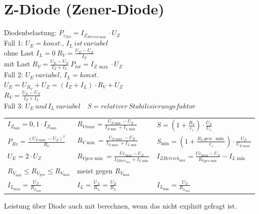 \section{Z-Diode (Zener-Diode)}\label{sec:zener-diode}
    Diodenbelastung: $P_{v_{ZD}}=I_{Z_{Betrieb\max}}\cdot U_Z$\\
    Fall 1: $U_E=konst.,\, I_L\, ist\, variabel$\\
    \hspace*{1cm} ohne Last $I_L=0\: R_V=\frac{U_E-U_Z}{I_Z}$\\
    \hspace*{1cm} mit Last $R_V=\frac{U_E-U_Z}{I_Z+I_L}\: P_{tot}=I_{Z\, \max}\cdot U_Z$\\
    Fall 2: $U_E\, variabel,\, I_L=konst.$\\
    \hspace*{1cm} $U_E=U_{R_V}+U_Z=(I_Z+I_L)\cdot R_V+U_Z$\\
    \hspace*{1cm} $R_V=\frac{U_E-U_Z}{I_Z+I_L}$\\
    Fall 3: $U_E\, und\, I_L\, variabel\quad S=relativer\, Stabilisierungsfaktor$
    \begin{table}[H]
        \renewcommand{\arraystretch}{1.2}
        \begin{tabularx}{\columnwidth}{l l l}%
            $I_{Z_{\min}}=0,1\cdot I_{Z_{\max}}$            & $R_{Vmax}=\frac{U_{E\min}-U_Z}{I_{Z\min}+I_{L\max}}$
                & $S=(1+\frac{R_V}{r_z})\cdot\frac{U_Z}{U_e}$\\
            $P_{Rv}=\frac{(U_{E\max}-U_Z)^2}{R_V}$          & $R_{V\min}=\frac{U_{E\max}-U_Z}{I_{Z\max}+I_{L\min}}$
                & $S_{\min}=(1+\frac{R_V\,gew.\,\min}{r_z})\cdot\frac{U_Z}{U_{E\max}}$\\
            $U_E=2\cdot U_Z$                                & $R_{Vgew\min}=\frac{U{e_{\max}}-U_Z}{I_{ZBetr_{\max}}+I_{L\min}}$
                & $I_{Z{Betrieb_{\max}}}=\frac{U{e_{\max}}-U_Z}{R_{Vgew\min}}-I_{L\min}$\\
            $R_{V_{\min}}\leq R_{V_{gew}} \leq R_{V_{\max}}$& meist gegen $R_{V_{\max}}$
                & \\
            $I_{L_{\max}}=\frac{U_Z}{R_{L_{\min}}}$         & $I_L=\frac{U_A}{R_L}=\frac{U_Z}{R_L}$
                & $I_{L_{\min}}=\frac{U_Z}{R_{L_{\max}}}$ \\
        \end{tabularx}
    \end{table}
    Leistung über Diode auch mit berechnen, wenn das nicht explizit gefragt ist.\\
    

